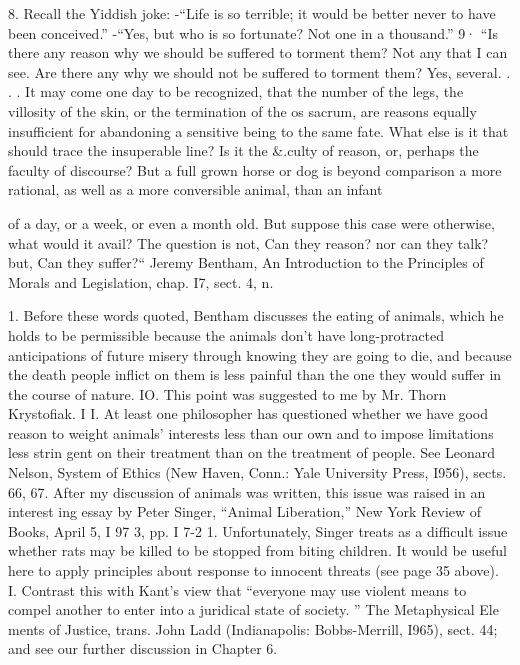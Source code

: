 \documentclass[11pt,openany]{book}
\begin{document}
{8. Recall the Yiddish joke: -``Life is so terrible; it would be better never to have been conceived.'' -``Yes, but who is so fortunate? Not one in a thousand.'' 9· ``Is there any reason why we should be suffered to torment them? Not any that I can see. Are there any why we should not be suffered to torment them? Yes, several. . . . It may come one day to be recognized, that the number of the legs, the villosity of the skin, or the termination of the os sacrum, are reasons equally insufficient for abandoning a sensitive being to the same fate. What else is it that should trace the insuperable line? Is it the \&.culty of reason, or, perhaps the faculty of discourse? But a full grown horse or dog is beyond comparison a more rational, as well as a more conversible animal, than an infant\par

of a day, or a week, or even a month old. But suppose this case were otherwise, what would it avail? The question is not, Can they reason? nor can they talk? but, Can they suffer?`` Jeremy Bentham, An Introduction to the Principles of Morals and Legislation, chap. I7, sect. 4, n.\par

1. Before these words quoted, Bentham discusses the eating of animals, which he holds to be permissible because the animals don't have long-protracted anticipations of future misery through knowing they are going to die, and because the death people inflict on them is less painful than the one they would suffer in the course of nature. IO. This point was suggested to me by Mr. Thorn Krystofiak. I I. At least one philosopher has questioned whether we have good reason to weight animals' interests less than our own and to impose limitations less strin gent on their treatment than on the treatment of people. See Leonard Nelson, System of Ethics (New Haven, Conn.: Yale University Press, I956), sects. 66, 67. After my discussion of animals was written, this issue was raised in an interest ing essay by Peter Singer, ``Animal Liberation,'' New York Review of Books, April 5, I 97 3, pp. I 7-2 1. Unfortunately, Singer treats as a difficult issue whether rats may be killed to be stopped from biting children. It would be useful here to apply principles about response to innocent threats (see page 35 above). I. Contrast this with Kant's view that ``everyone may use violent means to compel another to enter into a juridical state of society. '' The Metaphysical Ele ments of Justice, trans. John Ladd (Indianapolis: Bobbs-Merrill, I965), sect. 44; and see our further discussion in Chapter 6.\par

}
\end{document}
